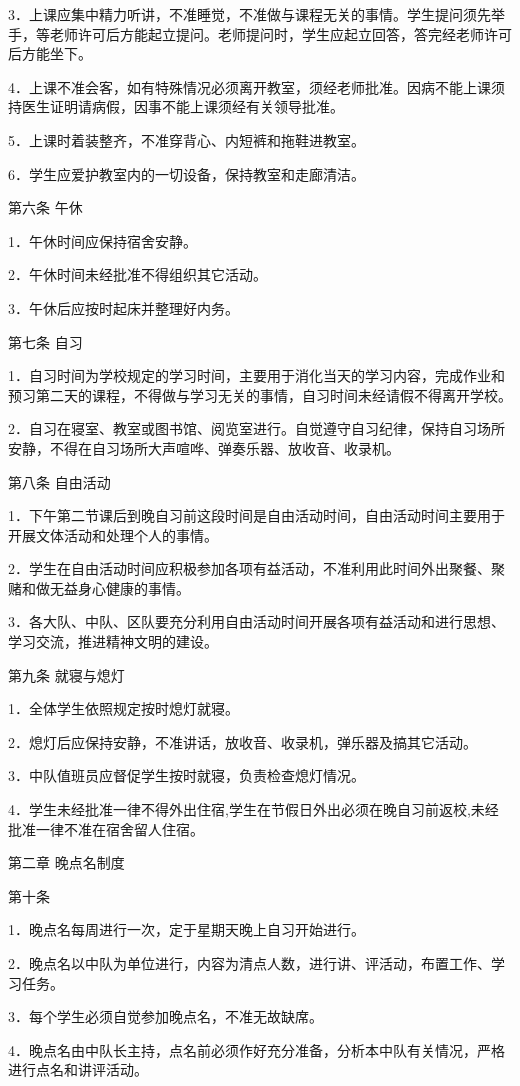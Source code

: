 \documentclass[UTF8,12pt,a4paper]{report}
\begin{document}
3．上课应集中精力听讲，不准睡觉，不准做与课程无关的事情。学生提问须先举手，等老师许可后方能起立提问。老师提问时，学生应起立回答，答完经老师许可后方能坐下。

4．上课不准会客，如有特殊情况必须离开教室，须经老师批准。因病不能上课须持医生证明请病假，因事不能上课须经有关领导批准。

5．上课时着装整齐，不准穿背心、内短裤和拖鞋进教室。

6．学生应爱护教室内的一切设备，保持教室和走廊清洁。

第六条 午休

1．午休时间应保持宿舍安静。

2．午休时间未经批准不得组织其它活动。

3．午休后应按时起床并整理好内务。

第七条 自习

1．自习时间为学校规定的学习时间，主要用于消化当天的学习内容，完成作业和预习第二天的课程，不得做与学习无关的事情，自习时间未经请假不得离开学校。

2．自习在寝室、教室或图书馆、阅览室进行。自觉遵守自习纪律，保持自习场所安静，不得在自习场所大声喧哗、弹奏乐器、放收音、收录机。

第八条 自由活动

1．下午第二节课后到晚自习前这段时间是自由活动时间，自由活动时间主要用于开展文体活动和处理个人的事情。

2．学生在自由活动时间应积极参加各项有益活动，不准利用此时间外出聚餐、聚赌和做无益身心健康的事情。

3．各大队、中队、区队要充分利用自由活动时间开展各项有益活动和进行思想、学习交流，推进精神文明的建设。

第九条 就寝与熄灯

1．全体学生依照规定按时熄灯就寝。

2．熄灯后应保持安静，不准讲话，放收音、收录机，弹乐器及搞其它活动。

3．中队值班员应督促学生按时就寝，负责检查熄灯情况。

4．学生未经批准一律不得外出住宿,学生在节假日外出必须在晚自习前返校,未经批准一律不准在宿舍留人住宿。

第二章 晚点名制度

第十条

1．晚点名每周进行一次，定于星期天晚上自习开始进行。

2．晚点名以中队为单位进行，内容为清点人数，进行讲、评活动，布置工作、学习任务。

3．每个学生必须自觉参加晚点名，不准无故缺席。

4．晚点名由中队长主持，点名前必须作好充分准备，分析本中队有关情况，严格进行点名和讲评活动。
\end{document}
